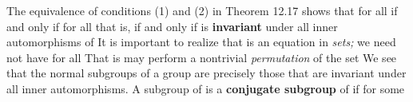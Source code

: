 \documentclass[11pt,oneside]{article}
\begin{document}
\begin{BookBody}
The equivalence of conditions (1) and (2) in Theorem 12.17 shows that  for all  if and only if  for all  that is, if and only if  is\textbf{ invariant} under all inner automorphisms of  It is important to realize that  is an 
equation in\textit{ sets;} we need not have  for all  That is  may perform a nontrivial\textit{ permutation} of the set  We see that the normal subgroups of a group  are precisely those that are invariant under all inner automorphisms. A subgroup  of  is a\textbf{ conjugate subgroup} of  if  for some 

\end{BookBody}

\BookNarrativetrue

\begin{BookBody}

\end{BookBody}

\BookNarrativefalse
\end{document}

